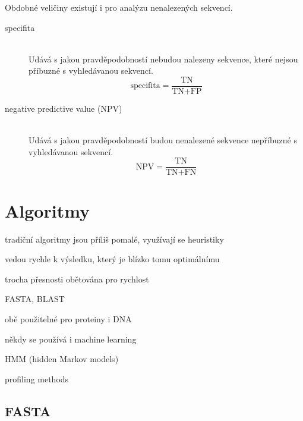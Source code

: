 \documentclass[DIV=8]{scrreprt}
\begin{document}
Obdobné veličiny existují i pro analýzu nenalezených sekvencí.

\begin{description}
\item[specifita]\hfill \\
Udává s jakou pravděpodobností nebudou nalezeny sekvence, které nejsou příbuzné s vyhledávanou sekvencí.
\[\text{specifita} = \frac{\text{TN}}{\text{TN} + \text{FP}}\]


\item[negative predictive value (NPV)]\hfill \\
Udává s jakou pravděpodobností budou nenalezené sekvence nepříbuzné s vyhledávanou sekvencí.
\[\text{NPV} = \frac{\text{TN}}{\text{TN} + \text{FN}}\]

\end{description}


\section{Algoritmy} \label{Algoritmy} \FloatBarrier


\begin{myItemize}[nosep]
    \item tradiční algoritmy jsou příliš pomalé, využívají se heuristiky
\begin{myItemize}[nosep]
    \item vedou rychle k výsledku, který je blízko tomu optimálnímu
    \item trocha přesnosti obětována pro rychlost
    \item FASTA, BLAST
    \item obě použitelné pro proteiny i DNA
\end{myItemize}

    \item někdy se používá i machine learning
\begin{myItemize}[nosep]
    \item HMM (hidden Markov models)
    \item profiling methods
\end{myItemize}

\end{myItemize}



\subsection{FASTA} \label{FASTA}
\end{document}
